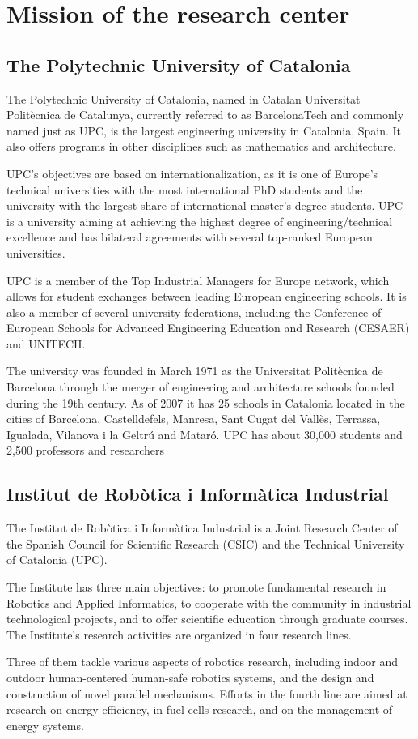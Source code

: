 
\chapter{Mission of the research center}
\label{context}

\section{The Polytechnic University of Catalonia}

The Polytechnic University of Catalonia, named in Catalan Universitat Politècnica de Catalunya, currently referred to as BarcelonaTech and commonly named just as UPC, is the largest engineering university in Catalonia, Spain.
It also offers programs in other disciplines such as mathematics and architecture.

UPC's objectives are based on internationalization, as it is one of Europe's technical universities with the most international PhD students and the university with the largest share of international master's degree students.
UPC is a university aiming at achieving the highest degree of engineering/technical excellence and has bilateral agreements with several top-ranked European universities.


UPC is a member of the Top Industrial Managers for Europe network, which allows for student exchanges between leading European engineering schools.
It is also a member of several university federations, including the Conference of European Schools for Advanced Engineering Education and Research (CESAER) and UNITECH.

The university was founded in March 1971 as the Universitat Politècnica de Barcelona through the merger of engineering and architecture schools founded during the 19th century.
As of 2007 it has 25 schools in Catalonia located in the cities of Barcelona, Castelldefels, Manresa, Sant Cugat del Vallès, Terrassa, Igualada, Vilanova i la Geltrú and Mataró.
UPC has about 30,000 students and 2,500 professors and researchers

\section{Institut de Robòtica i Informàtica Industrial}



The Institut de Robòtica i Informàtica Industrial is a Joint Research Center of the Spanish Council for Scientific Research (CSIC) and the Technical University of Catalonia (UPC).

 The Institute has three main objectives: to promote fundamental research in Robotics and Applied Informatics, to cooperate with the community in industrial technological projects, and to offer scientific education through graduate courses.
The Institute's research activities are organized in four research lines.

Three of them tackle various aspects of robotics research, including indoor and outdoor human-centered human-safe robotics systems, and the design and construction of novel parallel mechanisms.
Efforts in the fourth line are aimed at research on energy efficiency, in fuel cells research, and on the management of energy systems.
